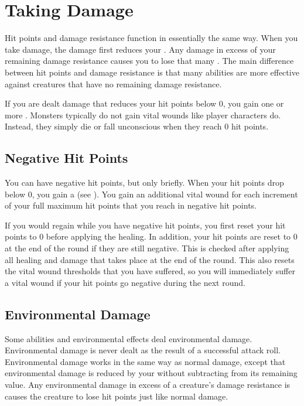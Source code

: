 \section{Taking Damage}\label{Taking Damage}
  Hit points and damage resistance function in essentially the same way.
  When you take damage, the damage first reduces your .
  Any damage in excess of your remaining damage resistance causes you to lose that many .
  The main difference between hit points and damage resistance is that many abilities are more effective against creatures that have no remaining damage resistance.

  If you are dealt damage that reduces your hit points below 0, you gain one or more .
  Monsters typically do not gain vital wounds like player characters do.
  Instead, they simply die or fall unconscious when they reach 0 hit points.

  \subsection{Negative Hit Points}\label{Negative Hit Points}
    You can have negative hit points, but only briefly.
    When your hit points drop below 0, you gain a  (see ).
    You gain an additional vital wound for each increment of your full maximum hit points that you reach in negative hit points.

    If you would regain  while you have negative hit points, you first reset your hit points to 0 before applying the healing.
    In addition, your hit points are reset to 0 at the end of the round if they are still negative.
    This is checked after applying all healing and damage that takes place at the end of the round.
    This also resets the vital wound thresholds that you have suffered, so you will immediately suffer a vital wound if your hit points go negative during the next round.

  \subsection{Environmental Damage}\label{Environmental Damage}
    Some abilities and environmental effects deal environmental damage.
    Environmental damage is never dealt as the result of a successful attack roll.
    Environmental damage works in the same way as normal damage, except that environmental damage is reduced by your  without subtracting from its remaining value.
    Any environmental damage in excess of a creature's damage resistance is causes the creature to lose hit points just like normal damage.

